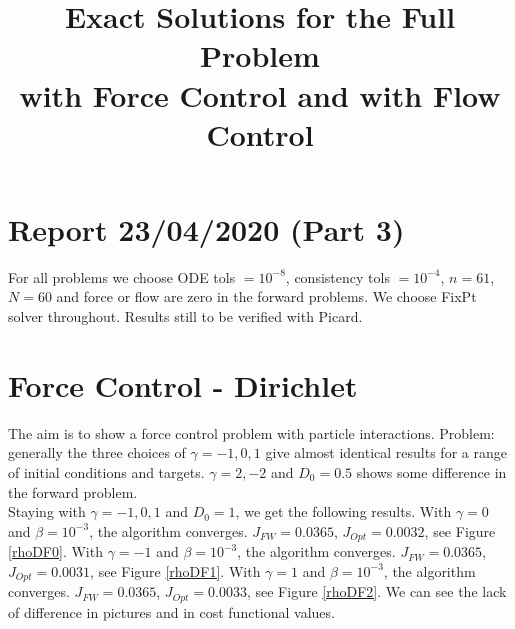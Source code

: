 \documentclass[11pt, a4paper]{article}
\title{Exact Solutions for the Full Problem \\with Force Control and with Flow Control}
\date{}
\theoremstyle{definition}
\begin{document}
\section*{Report 23/04/2020 (Part 3)}
For all problems we choose ODE tols $ = 10^{-8}$, consistency tols $= 10^{-4}$, $n=61$, $N= 60$ and force or flow are zero in the forward problems. We choose FixPt solver throughout. Results still to be verified with Picard.
\section{Force Control - Dirichlet}
The aim is to show a force control problem with particle interactions. Problem: generally the three choices of $\gamma = -1,0,1$ give almost identical results for a range of initial conditions and targets.
$\gamma =2,-2$ and $D_0 = 0.5$ shows some difference in the forward problem.\\
Staying with $\gamma = -1,0,1$ and $D_0 =1$, we get the following results.
With $\gamma = 0$ and $\beta = 10^{-3}$, the algorithm converges. $J_{FW} = 0.0365 $, $J_{Opt} = 0.0032$, see Figure \ref{rhoDF0}.
With $\gamma = -1$ and $\beta = 10^{-3}$, the algorithm converges. $J_{FW} = 0.0365$, $J_{Opt} = 0.0031$, see Figure \ref{rhoDF1}.
With $\gamma = 1$ and $\beta = 10^{-3}$, the algorithm converges. $J_{FW} = 0.0365 $, $J_{Opt} = 0.0033$, see Figure \ref{rhoDF2}.
We can see the lack of difference in pictures and in cost functional values.
\end{document}
